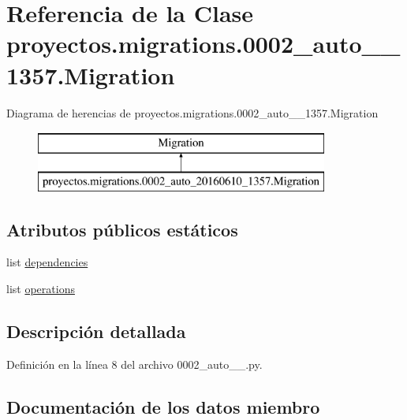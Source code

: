 \hypertarget{classproyectos_1_1migrations_1_10002__auto__20160610__1357_1_1_migration}{}\section{Referencia de la Clase proyectos.\+migrations.0002\+\_\+auto\+\_\+\_\+1357.Migration}
\label{classproyectos_1_1migrations_1_10002__auto__20160610__1357_1_1_migration}
Diagrama de herencias de proyectos.\+migrations.0002\+\_\+auto\+\_\+\_\+1357.Migration\begin{figure}[H]
\begin{center}
\leavevmode
\includegraphics[height=2.000000cm]{classproyectos_1_1migrations_1_10002__auto__20160610__1357_1_1_migration}
\end{center}
\end{figure}
\subsection*{Atributos públicos estáticos}
\begin{DoxyCompactItemize}
\item 
list \hyperlink{classproyectos_1_1migrations_1_10002__auto__20160610__1357_1_1_migration_aeb0c86388ea33c9c4eb0c3df25554f26}{dependencies}
\item 
list \hyperlink{classproyectos_1_1migrations_1_10002__auto__20160610__1357_1_1_migration_a04b80529312bac25450808d730733a31}{operations}
\end{DoxyCompactItemize}


\subsection{Descripción detallada}


Definición en la línea 8 del archivo 0002\+\_\+auto\+\_\+\_.\+py.



\subsection{Documentación de los datos miembro}
